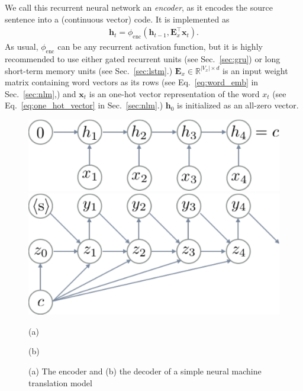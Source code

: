 \documentclass{report}
\newcommand{\vect}[1]{\mathbf{#1}}
\newcommand{\matr}[1]{\mathbf{#1}}
\newcommand{\vh}[0]{\vect{h}}
\newcommand{\vx}[0]{\vect{x}}
\newcommand{\mE}[0]{\matr{E}}
\newcommand{\RR}[0]{\mathbb{R}}
\newcommand{\enc}{\text{enc}}
\begin{document}
We call this recurrent neural network an {\em encoder}, as it encodes the source
sentence into a (continuous vector) code. It is implemented as
\begin{align}
    \label{eq:nmt_encoder}
    \vh_t = \phi_{\enc}\left( \vh_{t-1}, \mE_x^\top \vx_t \right).
\end{align}
As usual, $\phi_{\enc}$ can be any recurrent activation function, but it is
highly recommended to use either gated recurrent units (see Sec.~\ref{sec:gru})
or long short-term memory units (see Sec.~\ref{sec:lstm}.) $\mE_x \in \RR^{|V_x|
\times d}$ is an input weight matrix containing word vectors as its rows (see
Eq.~\eqref{eq:word_emb} in Sec.~\ref{sec:nlm},) and $\vx_t$ is an one-hot vector
representation of the word $x_t$ (see Eq.~\eqref{eq:one_hot_vector} in
Sec.~\ref{sec:nlm}.) $\vh_0$ is initialized as an all-zero vector.

\begin{figure}[t]
    \centering
    \begin{minipage}{0.48\textwidth}
        \centering
        \includegraphics[width=0.98\columnwidth]{figures/nmt_enc.pdf}
    \end{minipage}
    \hfill
    \begin{minipage}{0.48\textwidth}
        \centering
        \includegraphics[width=0.98\columnwidth]{figures/nmt_dec.pdf}
    \end{minipage}

    \begin{minipage}{0.48\textwidth}
        \centering
        (a)
    \end{minipage}
    \hfill
    \begin{minipage}{0.48\textwidth}
        \centering
        (b)
    \end{minipage}
    \caption{(a) The encoder and (b) the decoder of a simple neural machine
    translation model}
    \label{fig:nmt}
\end{figure}
\end{document}
